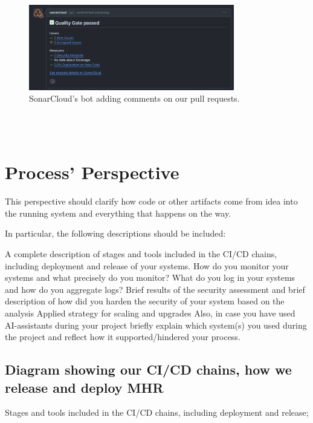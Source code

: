\documentclass{article}
\begin{document}
\begin{figure}[ht]
    \centering
    \includegraphics[width=0.8\textwidth]{./images/SonarCloud_bot.png}
    \caption{SonarCloud's bot adding comments on our pull requests.}
    \label{fig:notion-dashboard}
\end{figure}
\\\\

\section{Process' Perspective}

This perspective should clarify how code or other artifacts come from idea into the running system and everything that happens on the way.

In particular, the following descriptions should be included:

A complete description of stages and tools included in the CI/CD chains, including deployment and release of your systems.
How do you monitor your systems and what precisely do you monitor?
What do you log in your systems and how do you aggregate logs?
Brief results of the security assessment and brief description of how did you harden the security of your system based on the analysis
Applied strategy for scaling and upgrades
Also, in case you have used AI-assistants during your project briefly explain which system(s) you used during the project and reflect how it supported/hindered your process.

\subsection{Diagram showing our CI/CD chains, how we release and deploy MHR}

Stages and tools included in the CI/CD chains, including deployment and release;
\end{document}
